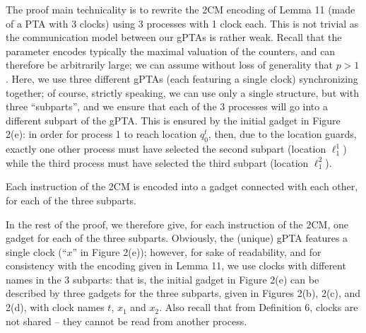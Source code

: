  
The proof main technicality is to rewrite the 2CM encoding of Lemma 11 (made of a PTA with 3 clocks) using 3 processes with 1 clock each. This is not trivial as the communication model between our gPTAs is rather weak. Recall that the parameter encodes typically the maximal valuation of the counters, and can therefore be arbitrarily large; we can assume without loss of generality that $p>1$. Here, we use three different gPTAs (each featuring a single clock) synchronizing together; of course, strictly speaking, we can use only a single structure, but with three “subparts”, and we ensure that each of the 3 processes will go into a different subpart of the gPTA. This is ensured by the initial gadget in Figure 2(e): in order for process 1 to reach location $q_{0}^{t}$, then, due to the location guards, exactly one other process must have selected the second subpart (location $\mathrm{\mathrm{\ell}}_{1}^{1}$) while the third process must have selected the third subpart (location $\mathrm{\mathrm{\ell}}_{1}^{2}$).\par
 
 
 
Each instruction of the 2CM is encoded into a gadget connected with each other, for each of the three subparts.\par
 
 
 
In the rest of the proof, we therefore give, for each instruction of the 2CM, one gadget for each of the three subparts. Obviously, the (unique) gPTA features a single clock (“$x$” in Figure 2(e)); however, for sake of readability, and for consistency with the encoding given in Lemma 11, we use clocks with different names in the 3 subparts: that is, the initial gadget in Figure 2(e) can be described by three gadgets for the three subparts, given in Figures 2(b), 2(c), and 2(d), with clock names $t$, $x_{1}$ and $x_{2}$. Also recall that from Definition 6, clocks are not shared -- they cannot be read from another process.\par
 
 
 

